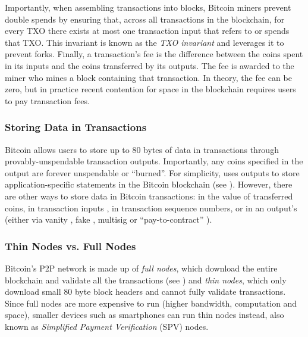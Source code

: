 Importantly, when assembling transactions into blocks, Bitcoin miners prevent double spends by ensuring that, across all transactions in the blockchain, for every TXO there exists at most one transaction input that refers to or spends that TXO.
This invariant is known as the \emph{TXO invariant} and \Sys leverages it to prevent forks.
Finally, a transaction's fee is the difference between the coins spent in its inputs and the coins transferred by its outputs.
The fee is awarded to the miner who mines a block containing that transaction.
In theory, the fee can be zero, but in practice recent contention for space in the blockchain requires users to pay transaction fees.

\subsubsection{Storing Data in Transactions}
\label{sec:background:bitcoin:opret}
Bitcoin allows users to store up to 80 bytes of data in transactions through provably-unspendable \opret transaction outputs.
Importantly, any coins specified in the output are forever unspendable or ``burned''.
For simplicity, \Sys uses \opret outputs to store application-specific statements in the Bitcoin blockchain (see ).
However, there are other ways to store data in Bitcoin transactions: in the value of transferred coins\cite{bitcoin-storing-data}, in transaction inputs \cite{bitcoin-p2sh-data}, in transaction sequence numbers\cite{bitcoin-storing-data}, or in an output's \pk (either via vanity \pks\cite{bitcoin-storing-data}, fake \pks\cite{keybase-scheme}, multisig \pks\cite{multisig} or ``pay-to-contract'' \pks\cite{bitcoin-pay-to-contract}).

\subsubsection{Thin Nodes vs. Full Nodes}
\label{sec:background:bitcoin:thin}
Bitcoin's P2P network is made up of \emph{full nodes}, which download the entire blockchain and validate all the transactions (see ) and \emph{thin nodes}, which only download small 80 byte block headers and cannot fully validate transactions.
Since full nodes are more expensive to run (higher bandwidth, computation and space), smaller devices such as smartphones can run thin nodes instead, also known as \emph{Simplified Payment Verification} (SPV) nodes.

